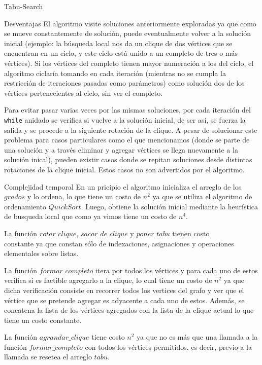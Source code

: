 \begin{section}{Tabu-Search}
\begin{subsection}{Desventajas}
		El algoritmo visite soluciones anteriormente exploradas ya que como se mueve constantemente de solución, puede eventualmente volver a la solución inicial (ejemplo: la búsqueda local nos da un clique de dos vértices que se encuentran en un ciclo, y este ciclo está unido a un completo de tres o más vértices). Si los vértices del completo tienen mayor numeración a los del ciclo, el algoritmo ciclaría tomando en cada iteración (mientras no se cumpla la restricción de iteraciones pasadas como parámetros) como solución dos de los vértices pertenecientes al ciclo, sin ver el completo.

		Para evitar pasar varias veces por las mismas soluciones, por cada iteración del \texttt{while} anidado se verifica si vuelve a la solución inicial, de ser así, se fuerza la salida y se procede a la siguiente rotación de la clique.
		A pesar de solucionar este problema para casos particulares como el que mencionamos (donde se parte de una solución y a través eliminar y agregar vértices se llega nuevamente a la solución inical), pueden existir casos donde se repitan soluciones desde distintas rotaciones de la clique inicial. Estos casos no son advertidos por el algoritmo.
	\end{subsection}

	\begin{subsection}{Complejidad temporal}
			En un pricipio el algoritmo inicializa el arreglo de los $grados$ y lo ordena, lo que tiene un costo de $n^2$ ya que se utiliza el algoritmo de ordenamiento $QuickSort$. Luego, obtiene la solución inicial mediante la heurística de busqueda local que como ya vimos tiene un costo de $n^4$.

			La función $rotar\_clique$, $sacar\_de\_clique$ y $poner\_tabu$ tienen costo\\ constante ya que constan sólo de indexaciones, asignaciones y operaciones elementales sobre listas.

			La función $formar\_completo$ itera por todos los vértices y para cada uno de estos verifica si es factible agregarlo a la clique, lo cual tiene un costo de $n^2$ ya que dicha verificación consiste en recorrer todos los vertices del grafo y ver que el vértice que se pretende agregar es adyacente a cada uno de estos. Además, se concatena la lista de los vértices agregados con la lista de la clique actual lo que tiene un costo constante.

			La función $agrandar\_clique$ tiene costo $n^2$ ya que no es más que una llamada a la función $formar\_completo$ con todos los vértices permitidos, es decir, previo a la llamada se resetea el arreglo $tabu$.


\end{subsection}
\end{section}
